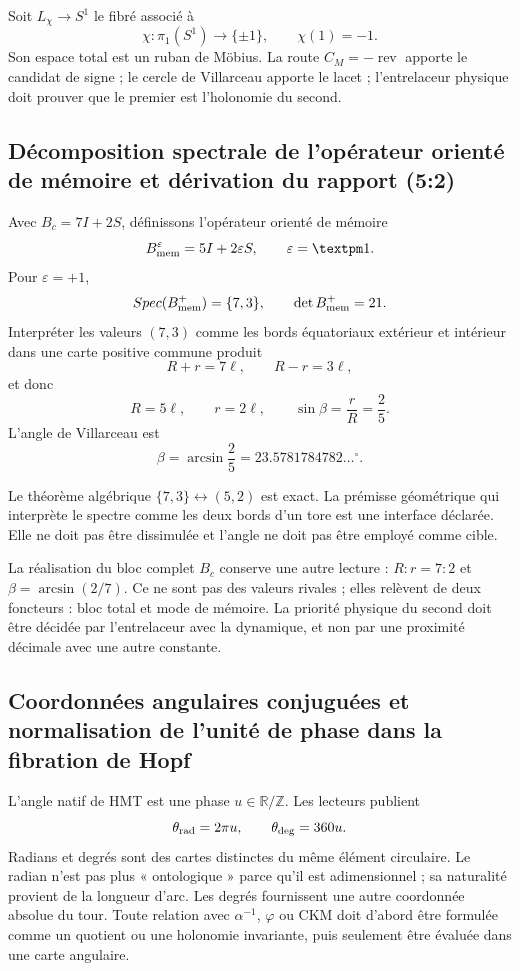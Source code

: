 Soit \(L_\chi\to S^1\) le fibré associé à
\[
\chi:\pi_1(S^1)\longrightarrow\{\pm1\},
\qquad \chi(1)=-1.
\]
Son espace total est un ruban de Möbius. La route \(C_M=-\operatorname{rev}\)
apporte le candidat de signe ; le cercle de Villarceau apporte le lacet ;
l’entrelaceur physique doit prouver que le premier est l’holonomie du second.

\subsection{Décomposition spectrale de l’opérateur orienté de mémoire et dérivation du rapport (5{:}2)}

Avec \(B_c=7I+2S\), définissons l’opérateur orienté de mémoire
\[
B_{\rm mem}^{\varepsilon}=5I+2\varepsilon S,
\qquad\varepsilon=\pm1.
\]
Pour \(\varepsilon=+1\),
\[
Spec(B_{\rm mem}^{+})=\{7,3\},
\qquad\det B_{\rm mem}^{+}=21.
\]
Interpréter les valeurs \((7,3)\) comme les bords équatoriaux extérieur et intérieur
dans une carte positive commune produit
\[
R+r=7\ell,\qquad R-r=3\ell,
\]
et donc
\[
R=5\ell,\qquad r=2\ell,\qquad
\sin\beta=\frac rR=\frac25.
\]
L’angle de Villarceau est
\[
\beta=\arcsin\frac25
=23.5781784782\ldots^\circ.
\]

Le théorème algébrique \(\{7,3\}\leftrightarrow(5,2)\) est exact. La prémisse
géométrique qui interprète le spectre comme les deux bords d’un tore est une
interface déclarée. Elle ne doit pas être dissimulée et l’angle ne doit pas être employé comme cible.

La réalisation du bloc complet \(B_c\) conserve une autre lecture :
\(R:r=7:2\) et \(\beta=\arcsin(2/7)\). Ce ne sont pas des valeurs rivales ; elles relèvent de
deux foncteurs : bloc total et mode de mémoire. La priorité physique du second
doit être décidée par l’entrelaceur avec la dynamique, et non par une proximité décimale avec
une autre constante.

\subsection{Coordonnées angulaires conjuguées et normalisation de l’unité de phase dans la fibration de Hopf}

L’angle natif de HMT est une phase \(u\in\mathbb R/\mathbb Z\). Les lecteurs
publient
\[
\theta_{\rm rad}=2\pi u,
\qquad
\theta_{\rm deg}=360u.
\]
Radians et degrés sont des cartes distinctes du même élément circulaire. Le radian
n’est pas plus « ontologique » parce qu’il est adimensionnel ; sa naturalité provient de la
longueur d’arc. Les degrés fournissent une autre coordonnée absolue du
tour. Toute relation avec \(\alpha^{-1}\), \(\varphi\) ou CKM doit
d’abord être formulée comme un quotient ou une holonomie invariante, puis seulement
être évaluée dans une carte angulaire.


